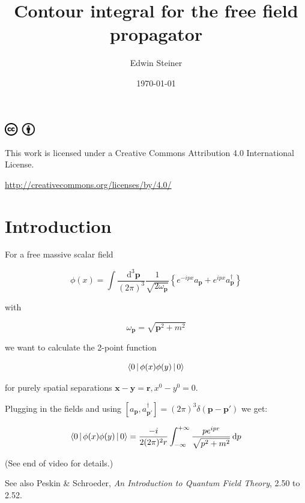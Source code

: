 \documentclass[aspectratio=169]{beamer}
\title{Contour integral for the free field propagator}
\author{Edwin Steiner}
\date{\today}
\newcommand{\sqrtpm}{\sqrt{p^2 + m^2}}
\newcommand{\vp}{\mathbf{p}}
\newcommand{\vx}{\mathbf{x}}
\newcommand{\vy}{\mathbf{y}}
\newcommand{\vr}{\mathbf{r}}
\newcommand{\vpp}{\mathbf{p}'}
\newcommand{\omvp}{\omega_{\vp}}
\newcommand{\ap}{a_{\vp}}
\newcommand{\adp}{a^\dagger_{\vp}}
\newcommand{\adpp}{a^\dagger_{\vpp}}
\newcommand{\diffop}{\mathop{}\!\mathrm{d}}
\newcommand{\dip}{\diffop p}
\newcommand{\intpthree}{\int \frac{\diffop^3\vp}{(2\pi)^3}}
\newcommand{\com}[2]{[{#1},{#2}]}
\newcommand{\phixy}{\Braket{0|\phi(x)\phi(y)|0}}
\newcommand{\intii}{\int_{-\infty}^{+\infty}}
\begin{document}



\begin{frame}
\titlepage
\begin{tiny}
\includegraphics[width=0.1\textwidth]{CC_BY.png}

\medskip
This work is licensed under a Creative Commons Attribution 4.0 International License.

\url{http://creativecommons.org/licenses/by/4.0/} \hfill \gitHash
\end{tiny}
\end{frame}


\section{Introduction}


\begin{frame}
For a free massive \alert{scalar field}

\pause
$$\phi(x) = \intpthree \frac{1}{\sqrt{2\omvp}} \left\{ e^{-ipx} \ap + e^{ipx} \adp \right\}$$

with

$$\omvp = \sqrt{\vp^2 + m^2}$$

\pause
we want to calculate the \alert{2-point function}

\pause
$$\phixy$$

\pause
\medskip
for \alert{purely spatial} separations $\vx - \vy = \vr, x^0 - y^0 = 0$.
\end{frame}


\begin{frame}
Plugging in the fields and using $\com{\ap}{\adpp} = (2\pi)^3 \delta(\vp - \vpp)$ we get:

\pause
$$\phixy = \frac{-i}{2(2\pi)^2 r} \intii \frac{p e^{ipr}}{\sqrtpm} \dip$$

\pause
\bigskip
(See end of video for details.)

\pause
\medskip
See also Peskin \& Schroeder, \textit{An Introduction to Quantum Field Theory}, 2.50 to 2.52.
\end{frame}
\end{document}
